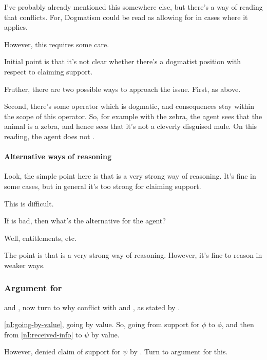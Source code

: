 \begin{note}
  I've probably already mentioned this somewhere else, but there's a way of reading \citeauthor{Pryor:2000tl} that conflicts.
  For, Dogmatism could be read as allowing for \RBV{} in cases where it applies.

  However, this requires some care.

  Initial point is that it's not clear whether there's a dogmatist position with respect to claiming support.

  Fruther, there are two possible ways to approach the issue.
  First, as above.

  Second, there's some operator which is dogmatic, and consequences stay within the scope of this operator.
  So, for example with the zebra, the agent sees that the animal is a zebra, and hence sees that it's not a cleverly disguised mule.
  On this reading, the agent does not \RBV{}.
\end{note}

\paragraph{Alternative ways of reasoning}

\begin{note}
  Look, the simple point here is that \RBV{} is a very strong way of reasoning.
  It's fine in some cases, but in general it's too strong for claiming support.
\end{note}

\begin{note}
  This is difficult.

  If \RBV{} is bad, then what's the alternative for the agent?

  Well, entitlements, etc.

  The point is that \RBV{} is a very strong way of reasoning.
  However, it's fine to reason in weaker ways.
\end{note}

\subsubsection{Argument for \nI{}}
\label{sec:argument-ni}

\begin{note}[Review of \nI{}]
  \incl{} and \RBV{}, now turn to why conflict with \incl{} and \RBV{}, as stated by \nI{}.

  \ref{nI:going-by-value}, going by value.
  So, going from support for \(\phi\) to \(\phi\), and then from \ref{nI:received-info} to \(\psi\) by value.

  However, denied claim of support for \(\psi\) by \incl{}.
  Turn to argument for this.
\end{note}

